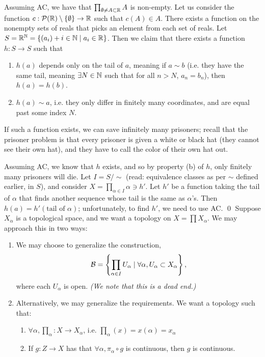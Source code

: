 \medskip
\noindent Assuming AC, we have that $\prod_{\emptyset \neq A \subset \mathbb R} A$ is non-empty. Let us consider the function $c : \mathcal P(\mathbb R) \setminus \{ \emptyset \} \to \mathbb R$ such that $c(A) \in A$. There exists a function on the nonempty sets of reals that picks an element from each set of reals.
\medskip\newline
Let $S = \mathbb R^\mathbb N = \{(a_i)+{i \in \mathbb N} \mid a_i \in \mathbb R\}$. Then we claim that there exists a function $h : S \to S$ such that
\begin{enumerate}[label=(\alph*)]
    \item $h(a)$ depends only on the tail of $a$, meaning if $a \sim b$ (i.e. they have the same tail, meaning $\exists N \in \mathbb N$ such that for all $n > N$, $a_n = b_n$), then $h(a) = h(b)$.
    \item $h(a) \sim a$, i.e. they only differ in finitely many coordinates, and are equal past some index $N$.
\end{enumerate}
\begin{simpleclaim}
    If such a function exists, we can save infinitely many prisoners; recall that the prisoner problem is that every prisoner is given a white or black hat (they cannot see their own hat), and they have to call the color of their own hat out.
\end{simpleclaim}
\noindent Assuming AC, we know that $h$ exists, and so by property (b) of $h$, only finitely many prisoners will die.
\medskip\newline
Let $I = S/\sim$ (read: equivalence classes as per $\sim$ defined earlier, in $S$), and consider $X = \prod_{\alpha \in I} \alpha \ni h'$. Let $h'$ be a function taking the tail of $\alpha$ that finds another sequence whose tail is the same as $\alpha$'s. Then $h(a) = h'(\text{tail of }\alpha)$; unfortunately, to find $h'$, we need to use AC. \qed
\medskip\newline
\noindent Suppose $X_\alpha$ is a topological space, and we want a topology on $X = \prod X_\alpha$. We may approach this in two ways:
\begin{enumerate}
    \item We may choose to generalize the construction,
    \[ \mathcal B = \left\{\prod_{\alpha \in I} U_\alpha \mid \forall \alpha, U_\alpha \subset X_\alpha\right\}, \]
    where each $U_\alpha$ is open. \textit{(We note that this is a dead end.)}
    \item Alternatively, we may generalize the requirements. We want a topology such that:
    \begin{enumerate}[label=(\alph*)]
        \item $\forall \alpha, \prod_\alpha : X \to X_\alpha$, i.e. $\prod_\alpha(x) = x(\alpha) = x_\alpha$
        \item If $g : Z \to X$ has that $\forall \alpha, \pi_\alpha \circ g$ is continuous, then $g$ is continuous.
    \end{enumerate}
\end{enumerate}


